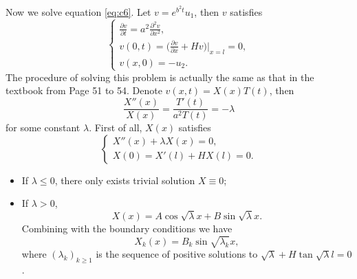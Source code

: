 \begin{solution}
    Now we solve equation \eqref{eq:c6}. Let $v = e^{b^2 t}u_1$, then $v$ satisfies
    \begin{equation}\label{eq:c10}
      \begin{cases}
        \frac{\partial v}{\partial t} = a^2 \frac{\partial^2 v}{\partial x^2}, \\
        v(0,t) = \bigl(\frac{\partial v}{\partial x} + Hv\bigr)\big|_{x=l} = 0, \\
        v(x,0) = -u_2.
      \end{cases}      
    \end{equation}
    The procedure of solving this problem is actually the same as that in the textbook
    from Page 51 to 54.
    Denote $v(x,t) = X(x)T(t)$, then
    \[ \frac{X''(x)}{X(x)} = \frac{T'(t)}{a^2 T(t)} = -\lambda \]
    for some constant $\lambda$. First of all, $X(x)$ satisfies
    \begin{equation}\label{eq:c11}
      \begin{cases}
        X''(x) + \lambda X(x) = 0, \\
        X(0) = X'(l) + HX(l) = 0.
      \end{cases}
    \end{equation}
    \begin{itemize}
      \item If $\lambda\leq 0$, there only exists trivial solution $X\equiv 0$;
      \item If $\lambda>0$,
        \begin{equation}\label{eq:c12}
          X(x) = A\cos\sqrt{\lambda}x + B\sin\sqrt{\lambda}x.
        \end{equation}
        Combining with the boundary conditions we have
        \begin{equation}\label{eq:c13}
          X_k(x) = B_k \sin\sqrt{\lambda_k} x,
        \end{equation}
        where $(\lambda_k)_{k\geq 1}$ is the sequence of positive solutions to
        $\sqrt\lambda + H\tan\sqrt\lambda l = 0$.
    \end{itemize}


\end{solution}
